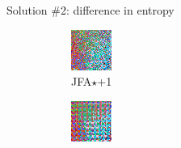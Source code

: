 \documentclass[aspectratio=169, 22pt]{beamer}
\begin{document}

\begin{frame}{Solution \#2: difference in entropy}

\begin{figure}
\centering
\begin{subfigure}{.3\textwidth}
  \centering
  \includegraphics[width=0.8\linewidth]{./zoom2.png}
	\caption{JFA$\star$+1}
  \label{fig:sub1}
\end{subfigure}%
\begin{subfigure}{.3\textwidth}%
  \centering
  \includegraphics[width=0.8\linewidth]{./zoom1.png}

\end{subfigure}
\end{figure}
\end{frame}
\end{document}
